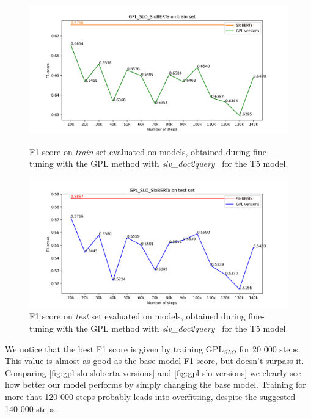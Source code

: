 \documentclass[fleqn,moreauthors,10pt]{ds_report}
\begin{document}
\begin{figure}
    \centering
    \begin{minipage}{0.5\textwidth}
        \centering
        \includegraphics[width=\linewidth]{graphs/GPL_SLO_SloBERTa_train.png}
        \caption{F1 score on \textit{train} set evaluated on models, obtained during fine-tuning with the GPL method with {\it slv\_doc2query}~\cite{boshko} for the T5 model.}
		\label{fig:gpl-sloberta-slo-versions-train}
    \end{minipage}\hfill
    \begin{minipage}{0.5\textwidth}
        \centering
        \includegraphics[width=\linewidth]{graphs/GPL_SLO_SloBERTa_test.png}
        \caption{F1 score on \textit{test} set evaluated on models, obtained during fine-tuning with the GPL method with {\it slv\_doc2query}~\cite{boshko} for the T5 model.}
		\label{fig:gpl-sloberta-slo-versions}
    \end{minipage}
\end{figure}

We notice that the best F1 score is given by training $\text{GPL}_{SLO}$ for 20 000 steps. This value is almost as good
as the base model F1 score, but doesn't surpass it. Comparing \ref*{fig:gpl-slo-sloberta-versions} and \ref*{fig:gpl-slo-versions}
we clearly see how better our model performs by simply changing the base model. Training for more that 120 000 steps probably
leads into overfitting, despite the suggested~\cite{GPL} 140 000 steps.
\end{document}

